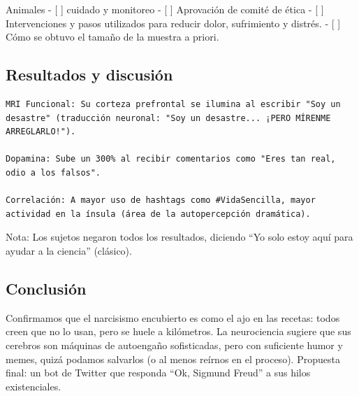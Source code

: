 \documentclass[
]{article}
\begin{document}
Animales - {[} {]} cuidado y monitoreo - {[} {]} Aprovación de comité de
ética - {[} {]} Intervenciones y pasos utilizados para reducir dolor,
sufrimiento y distrés. - {[} {]} Cómo se obtuvo el tamaño de la muestra
a priori.

\subsection{Resultados y discusión}\label{resultados-y-discusiuxf3n}

\begin{verbatim}
MRI Funcional: Su corteza prefrontal se ilumina al escribir "Soy un desastre" (traducción neuronal: "Soy un desastre... ¡PERO MÍRENME ARREGLARLO!").

Dopamina: Sube un 300% al recibir comentarios como "Eres tan real, odio a los falsos".

Correlación: A mayor uso de hashtags como #VidaSencilla, mayor actividad en la ínsula (área de la autopercepción dramática).
\end{verbatim}

Nota: Los sujetos negaron todos los resultados, diciendo ``Yo solo estoy
aquí para ayudar a la ciencia'' (clásico).

\subsection{Conclusión}\label{conclusiuxf3n}

Confirmamos que el narcisismo encubierto es como el ajo en las recetas:
todos creen que no lo usan, pero se huele a kilómetros. La neurociencia
sugiere que sus cerebros son máquinas de autoengaño sofisticadas, pero
con suficiente humor y memes, quizá podamos salvarlos (o al menos
reírnos en el proceso). Propuesta final: un bot de Twitter que responda
``Ok, Sigmund Freud'' a sus hilos existenciales.
\end{document}
